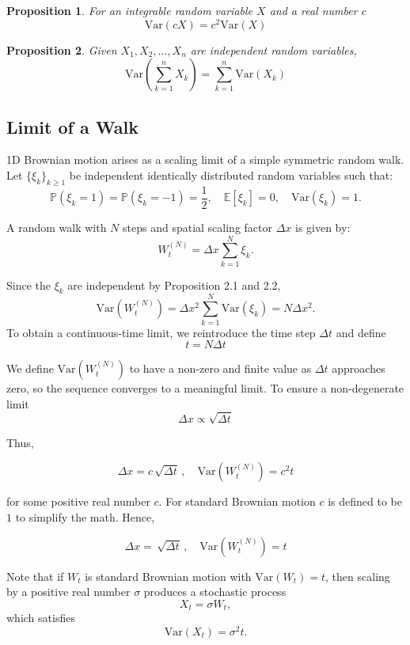 \documentclass[12pt]{article}
\theoremstyle{definition}
\theoremstyle{plain}
\newtheorem{proposition}{Proposition}[section]
\theoremstyle{remark}
\begin{document}
\begin{proposition}
For an integrable random variable $X$ and a real number $c$
\[
\text{Var}(cX) = c^2\text{Var}(X)
\]
\end{proposition}

\begin{proposition}
Given $X_1,X_2,...,X_n$ are independent random variables,
\[
\text{Var} \left( \sum_{k=1}^n X_k \right) = \sum_{k=1}^n \text{Var} (X_k)
\]
\end{proposition}



\subsection{Limit of a Walk}

1D Brownian motion arises as a scaling limit of a simple symmetric random walk. Let $\{\xi_k\}_{k\geq 1}$ be independent identically distributed random variables such that:
\[
\mathbb{P}(\xi_k = 1) = \mathbb{P}(\xi_k = -1) = \frac{1}{2},
\quad \mathbb{E}[\xi_k]=0,\quad \mathrm{Var}(\xi_k)=1.
\]

A random walk with $N$ steps and spatial scaling factor $\Delta x$ is given by:
\[
W_t^{(N)} = \Delta x \sum_{k=1}^N \xi_k.
\]

Since the $\xi_k$ are independent by Proposition 2.1 and 2.2,
\[
\mathrm{Var}\!\left(W_t^{(N)}\right)
= \Delta x^2 \sum_{k=1}^N \mathrm{Var}(\xi_k)
= N \Delta x^2.
\]
To obtain a continuous-time limit, we reintroduce the time step $\Delta t$ and define
\[
t = N \Delta t
\]

We define $\mathrm{Var}\!\left(W_t^{(N)}\right)$ to have a non-zero and finite value as $\Delta t$ approaches zero, so the sequence converges to a meaningful limit.  To ensure a non-degenerate limit 
\[
\Delta x \propto \sqrt{\Delta t}
\]

Thus,

\[
\Delta x = c \, \sqrt{\Delta t} \, , \quad \mathrm{Var}\!\left(W_t^{(N)}\right) = c^2t
\]

for some positive real number $c$.  For standard Brownian motion $c$ is defined to be $1$ to simplify the math.  Hence,

\[
\Delta x = \, \sqrt{\Delta t} \, , \quad \mathrm{Var}\!\left(W_t^{(N)}\right) = t
\]

Note that if $W_t$ is standard Brownian motion with $\mathrm{Var}(W_t)=t$, then scaling by a positive real number $\sigma$ produces a stochastic process
\[
X_t = \sigma W_t,
\]
which satisfies
\[
\mathrm{Var}(X_t)=\sigma^2 t.
\]
\end{document}
